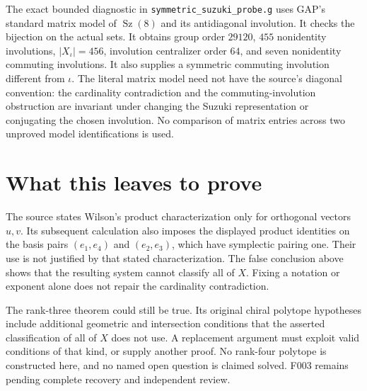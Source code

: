 \documentclass[11pt,a4paper]{article}
\begin{document}
The exact bounded diagnostic in \texttt{symmetric\_suzuki\_probe.g}
uses GAP's standard matrix model of $\operatorname{Sz}(8)$ and its
antidiagonal involution. It checks the bijection on the actual sets.
It obtains group order $29120$, $455$ nonidentity involutions,
$|X_\iota|=456$, involution centralizer order $64$, and seven
nonidentity commuting involutions. It also supplies a symmetric
commuting involution different from $\iota$. The literal matrix
model need not have the source's diagonal convention: the
cardinality contradiction and the commuting-involution obstruction
are invariant under changing the Suzuki representation or conjugating
the chosen involution. No comparison of matrix entries across two
unproved model identifications is used.

\section*{What this leaves to prove}
The source states Wilson's product characterization only for
orthogonal vectors $u,v$. Its subsequent calculation also imposes
the displayed product identities on the basis pairs $(e_1,e_4)$
and $(e_2,e_3)$, which have symplectic pairing one. Their use is
not justified by that stated characterization. The false conclusion
above shows that the resulting system cannot classify all of $X$.
Fixing a notation or exponent alone does not repair the cardinality
contradiction.

The rank-three theorem could still be true. Its original chiral
polytope hypotheses include additional geometric and intersection
conditions that the asserted classification of all of $X$ does
not use. A replacement argument must exploit valid conditions of
that kind, or supply another proof. No rank-four polytope is
constructed here, and no named open question is claimed solved.
F003 remains pending complete recovery and independent review.
\end{document}

